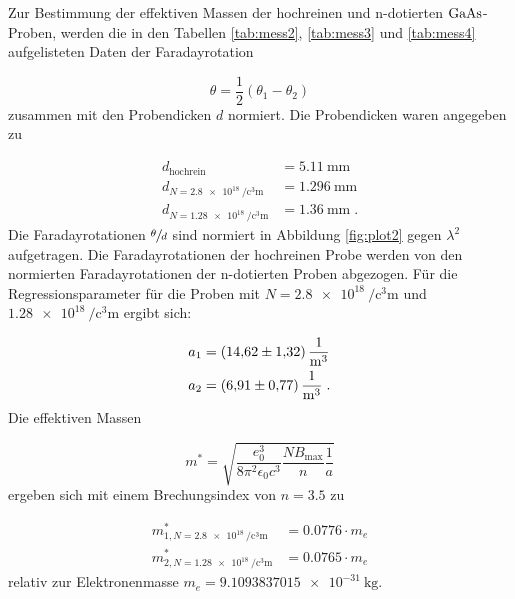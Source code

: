 \documentclass[
  bibliography=totoc,     %
  captions=tableheading,  %
  titlepage=firstiscover, %
]{scrartcl}
\begin{document}
Zur Bestimmung der effektiven Massen der hochreinen und n-dotierten $\ce{GaAs}$-Proben, werden die in den 
Tabellen \ref{tab:mess2}, \ref{tab:mess3} und \ref{tab:mess4} aufgelisteten Daten der Faradayrotation

\begin{equation}
    \theta = \frac{1}{2} (\theta_1 - \theta_2)
\end{equation}
zusammen mit den Probendicken $d$ normiert.
Die Probendicken waren angegeben zu

\begin{align*}
    d_\text{hochrein} &= \SI{5.11}{\milli\meter} \\
    d_{N = \SI{2.8e18}{\per\cubic\centi\meter}} &= \SI{1.296}{\milli\meter} \\
    d_{N = \SI{1.28e18}{\per\cubic\centi\meter}} &= \SI{1.36}{\milli\meter} \; .
\end{align*}
Die Faradayrotationen $\sfrac{\theta}{d}$ sind normiert in Abbildung \ref{fig:plot2} gegen $\lambda^2$ aufgetragen.
Die Faradayrotationen der hochreinen Probe werden von den normierten Faradayrotationen der n-dotierten Proben
abgezogen.
Für die Regressionsparameter für die Proben mit $N = \SI{2.8e18}{\per\cubic\centi\meter}$ und 
$\SI{1.28e18}{\per\cubic\centi\meter}$ ergibt sich:

\begin{align*}
    a_1 &= \SI{14.62 +- 1.32}{\meter\tothe{-3}}\\
    a_2 &= \SI{6.91 +- 0.77}{\meter\tothe{-3}}\; .
\end{align*}
Die effektiven Massen 

\begin{equation}
    m^* = \sqrt{\frac{e_0^3}{8\pi^2\epsilon_0 c^3} \frac{NB_\text{max}}{n} \frac{1}{a}}
\end{equation}
ergeben sich mit einem Brechungsindex von $n = \num{3.5}$ zu 
 
\begin{align*}
    m^*_{1,N = \SI{2.8e18}{\per\cubic\centi\meter}} &= \num{0.0776} \cdot m_e \\
    m^*_{2,N = \SI{1.28e18}{\per\cubic\centi\meter}} &= \num{0.0765} \cdot m_e 
\end{align*}
relativ zur Elektronenmasse $m_e = \SI{9.1093837015e-31}{\kilo\gram}$.
\end{document}
